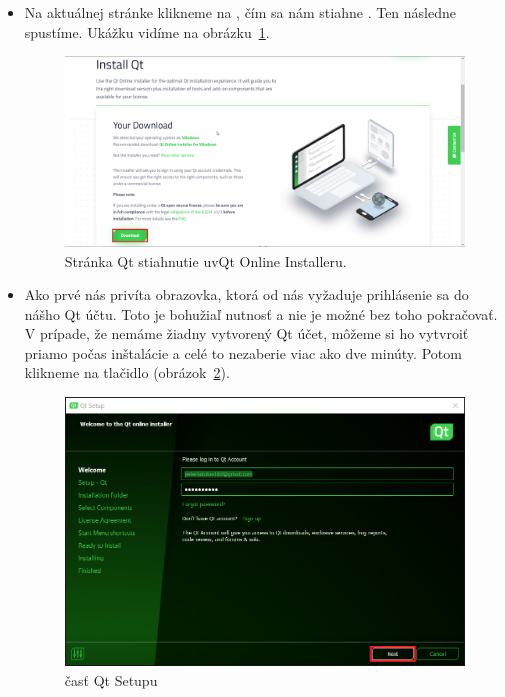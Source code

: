 \begin{itemize}
\item Na aktuálnej stránke klikneme na , čím sa nám stiahne . Ten následne spustíme. Ukážku vidíme na obrázku~\ref{obr:kap4:qt_online_down}.

\begin{figure}[!htb]
	\centering
	\includegraphics[width=12cm]{img/kap04_qt_online_down}
	\caption{Stránka Qt stiahnutie uv{Qt Online Installeru}.}
	\label{obr:kap4:qt_online_down}
\end{figure}

\newpage
\newpage

\item Ako prvé nás privíta obrazovka, ktorá od nás vyžaduje prihlásenie sa do nášho Qt účtu. Toto je bohužiaľ nutnosť a nie je možné bez toho pokračovať. V prípade, že nemáme žiadny vytvorený Qt účet, môžeme si ho vytvroiť priamo počas inštalácie a celé to nezaberie viac ako dve minúty. Potom klikneme na tlačidlo  (obrázok~\ref{obr:kap4:inst_welcome}).

\begin{figure}[!htb]
	\centering
	\includegraphics[width=12cm]{img/kap04_inst_welcome}
	\caption{ časť Qt Setupu}
	\label{obr:kap4:inst_welcome}
\end{figure}



\end{itemize}
